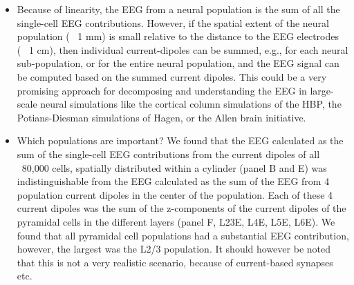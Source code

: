 \documentclass[preprint,10pt,authoryear]{elsarticle}
\newcommand{\sntxt}[1]{{\color{NavyBlue}#1}}
\begin{document}
\sntxt{
\begin{itemize}
	\item Because of linearity, the EEG from a neural population is the sum of all the single-cell EEG contributions. However, if the spatial extent of the neural population (~ 1 mm) is small relative to the distance to the EEG electrodes (~ 1 cm), then individual current-dipoles can be summed, e.g., for each neural sub-population, or for the entire neural population, and the EEG signal can be computed based on the summed current dipoles. This could be a very promising approach for decomposing and understanding the EEG in large-scale neural  simulations like the cortical column simulations of the HBP, the Potians-Diesman  simulations of Hagen, or the Allen brain initiative.
	\item Which populations are important? We found that the EEG calculated as the sum of the single-cell EEG contributions from the current dipoles of all ~80,000 cells, spatially distributed within a cylinder (panel B and E) was indistinguishable from the EEG calculated as the sum of the EEG from 4 population current dipoles in the center of the population. Each of these 4 current dipoles was the sum of the z-components of the current dipoles of the pyramidal cells in the different layers (panel F, L23E, L4E, L5E, L6E). We found that all pyramidal cell populations had a substantial EEG contribution, however, the largest was the L2/3 population. It should however be noted that this is not a very realistic scenario, because of current-based synapses etc.
	
\end{itemize}
	
	}
\end{document}
